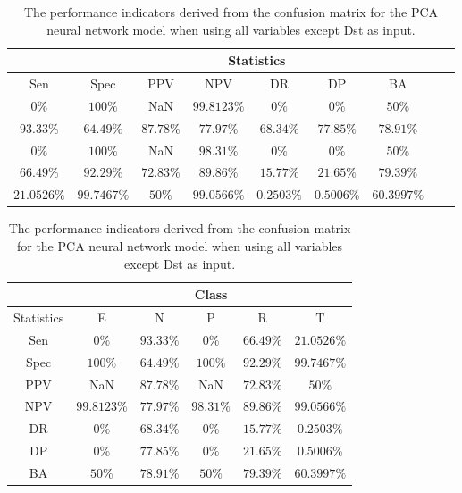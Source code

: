 \begin{table}[!ht]
	\centering
	\begin{tabular}{|c|c|c|c|c|c|c|c|c|}
		\hline
		 & \multicolumn{7}{c|}{Statistics} \\ \hline
		Sen & Spec & PPV & NPV & DR & DP & BA \\ \hline
		$0\%$ & $100\%$ & NaN & $99.8123\%$ & $0\%$ & $0\%$ & $50\%$ \\ \hline
		$93.33\%$ & $64.49\%$ & $87.78\%$ & $77.97\%$ & $68.34\%$ & $77.85\%$ & $78.91\%$ \\ \hline
		$0\%$ & $100\%$ & NaN & $98.31\%$ & $0\%$ & $0\%$ & $50\%$ \\ \hline
		$66.49\%$ & $92.29\%$ & $72.83\%$ & $89.86\%$ & $15.77\%$ & $21.65\%$ & $79.39\%$ \\ \hline
		$21.0526\%$ & $99.7467\%$ & $50\%$ & $99.0566\%$ & $0.2503\%$ & $0.5006\%$ & $60.3997\%$ \\ \hline
	\end{tabular}
	\caption{The performance indicators derived from the confusion matrix for the PCA neural network model when using all variables except Dst as input.}
	\label{tab:cs:noDst:pcaNNet}
\end{table}

\begin{table}[!ht]
	\centering
	\begin{tabular}{|c|c|c|c|c|c|}
		\hline
		 & \multicolumn{5}{c|}{Class} \\ \hline
		Statistics & E & N & P & R & T \\ \hline
		Sen & $0\%$ & $93.33\%$ & $0\%$ & $66.49\%$ & $21.0526\%$ \\ \hline
		Spec & $100\%$ & $64.49\%$ & $100\%$ & $92.29\%$ & $99.7467\%$ \\ \hline
		PPV & NaN & $87.78\%$ & NaN & $72.83\%$ & $50\%$ \\ \hline
		NPV & $99.8123\%$ & $77.97\%$ & $98.31\%$ & $89.86\%$ & $99.0566\%$ \\ \hline
		DR & $0\%$ & $68.34\%$ & $0\%$ & $15.77\%$ & $0.2503\%$ \\ \hline
		DP & $0\%$ & $77.85\%$ & $0\%$ & $21.65\%$ & $0.5006\%$ \\ \hline
		BA & $50\%$ & $78.91\%$ & $50\%$ & $79.39\%$ & $60.3997\%$ \\ \hline
	\end{tabular}
	\caption{The performance indicators derived from the confusion matrix for the PCA neural network model when using all variables except Dst as input.}
	\label{tab:cs:reverse:noDst:pcaNNet}
\end{table}

